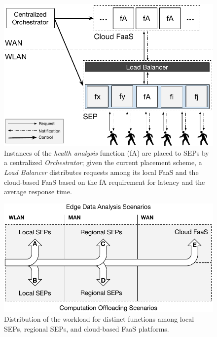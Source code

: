 \begin{figure}[tbp]
	\centering
	\includegraphics[width=\linewidth]{Figs/Edge_Data_Analytics_Personal_Assistant.pdf}
	\caption{Instances of the \textit{health analysis} function (fA) are placed to SEPs by a centralized \textit{Orchestrator}; given the current placement scheme, a \textit{Load Balancer} distributes requests among its local FaaS and the cloud-based FaaS based on the fA requirement for latency and the average response time.}
	\label{fig:Edge_Data_Analytics_Personal_Assistant}
\end{figure}

\begin{figure}[b]
	\centering
	\includegraphics[width=\linewidth]{Figs/Edge_Load_Placement}
	\caption{Distribution of the workload for distinct functions among local SEPs, regional SEPs, and cloud-based FaaS platforms.}
	\label{fig:Edge_Load_Placement}
\end{figure}



